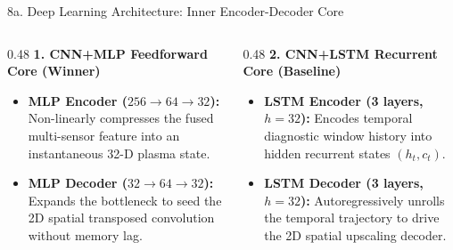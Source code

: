 \documentclass[aspectratio=169, 10pt]{beamer}
\begin{document}
\begin{frame}{8a. Deep Learning Architecture: Inner Encoder-Decoder Core}
  \vspace{4pt}
  \begin{columns}[T]
    \begin{column}{0.48\textwidth}
      \footnotesize
      \textbf{\color{ForestGreen!80!black} 1. CNN+MLP Feedforward Core (Winner)}
      \begin{itemize}
        \item \textbf{MLP Encoder ($256 \to 64 \to 32$):} Non-linearly compresses the fused multi-sensor feature into an instantaneous 32-D plasma state.
        \item \textbf{MLP Decoder ($32 \to 64 \to 32$):} Expands the bottleneck to seed the 2D spatial transposed convolution without memory lag.
      \end{itemize}
    \end{column}

    \begin{column}{0.48\textwidth}
      \footnotesize
      \textbf{\color{DarkRed!80!black} 2. CNN+LSTM Recurrent Core (Baseline)}
      \begin{itemize}
        \item \textbf{LSTM Encoder (3 layers, $h=32$):} Encodes temporal diagnostic window history into hidden recurrent states $(h_t, c_t)$.
        \item \textbf{LSTM Decoder (3 layers, $h=32$):} Autoregressively unrolls the temporal trajectory to drive the 2D spatial upscaling decoder.
      \end{itemize}
    \end{column}
  \end{columns}
\end{frame}
\end{document}
